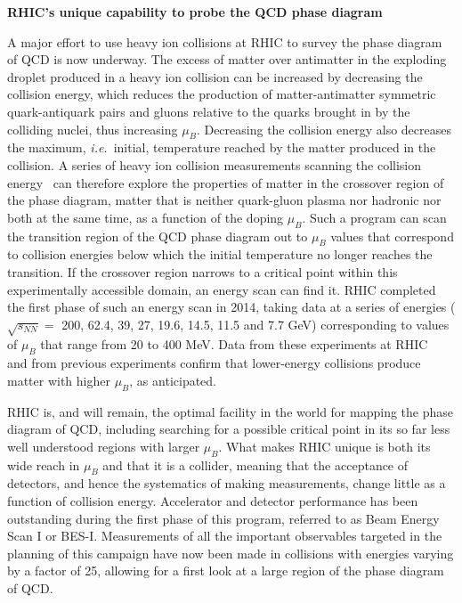 {\bf RHIC's unique capability to probe the QCD phase diagram}

A major effort to use heavy ion collisions at RHIC to survey the phase
diagram of QCD is now underway. The excess of matter over antimatter
in the exploding droplet produced in a heavy ion collision can be
increased by decreasing the collision energy, which reduces the
production of matter-antimatter symmetric quark-antiquark pairs and
gluons relative to the quarks brought in by the colliding nuclei, thus
increasing $\mu_B$. Decreasing the collision energy also decreases the
maximum, {\it i.e.}~initial, temperature reached by the matter produced in
the collision. A series of heavy ion collision measurements scanning
the collision energy~\cite{BESII} can therefore explore the properties
of matter in the crossover region of the phase diagram, matter that is
neither quark-gluon plasma nor hadronic nor both at the same time, as a
function of the doping $\mu_B$. Such a program can scan the transition
region of the QCD phase diagram out to $\mu_B$ values that correspond
to collision energies below which the initial temperature no longer
reaches the transition. If the crossover region narrows to a critical
point within this experimentally accessible domain, an energy scan can
find it. RHIC completed the first phase of such an energy scan in
2014, taking data at a series of energies ($\sqrt{s_{NN}}=$ 200, 62.4,
39, 27, 19.6, 14.5, 11.5 and 7.7 GeV) corresponding to values of
$\mu_B$ that range from 20 to 400 MeV. Data from these experiments at
RHIC~\cite{Kumar:2012fb,BESII} and from previous experiments confirm that
lower-energy collisions produce matter with higher $\mu_B$, as
anticipated. 

RHIC is, and will remain, the optimal facility in the world for
mapping the phase diagram of QCD, including searching for a possible
critical point in its so far less well understood regions with larger $\mu_B$.
What makes RHIC unique is both its wide
reach in $\mu_B$ and that it is a collider, meaning that the
acceptance of detectors, and hence the systematics of making
measurements, change little as a function of collision
energy. Accelerator and detector performance has been outstanding
during the first phase of this program, referred to as Beam Energy
Scan I or BES-I. Measurements of all the important observables
targeted in the planning of this campaign have now been made in
collisions with energies varying by a factor of 25, allowing for a
first look at a large region of the phase diagram of QCD.

